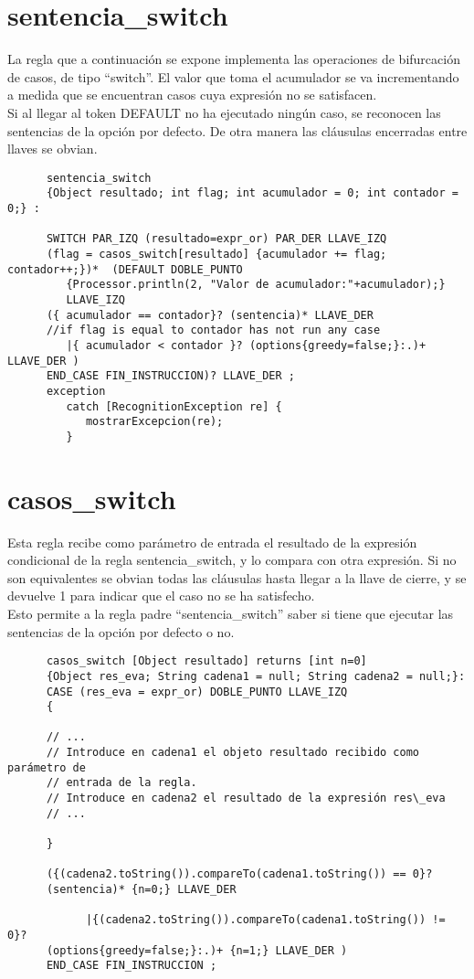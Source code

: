    \section{sentencia\_switch}
   La regla que a continuación se expone implementa las operaciones de bifurcación de casos, de tipo ``switch''. El valor que
   toma el acumulador se va incrementando a medida que se encuentran casos cuya expresión no se satisfacen.\\

   Si al llegar al token DEFAULT no ha ejecutado ningún caso, se reconocen las sentencias de la opción por defecto. De otra 
   manera las cláusulas encerradas entre llaves se obvian. 
   \begin{lstlisting}
      sentencia_switch 
      {Object resultado; int flag; int acumulador = 0; int contador = 0;} :
      
      SWITCH PAR_IZQ (resultado=expr_or) PAR_DER LLAVE_IZQ
      (flag = casos_switch[resultado] {acumulador += flag; contador++;})*  (DEFAULT DOBLE_PUNTO 
         {Processor.println(2, "Valor de acumulador:"+acumulador);} 
         LLAVE_IZQ
      ({ acumulador == contador}? (sentencia)* LLAVE_DER 
      //if flag is equal to contador has not run any case
         |{ acumulador < contador }? (options{greedy=false;}:.)+ LLAVE_DER )
      END_CASE FIN_INSTRUCCION)? LLAVE_DER ;
      exception
         catch [RecognitionException re] {
            mostrarExcepcion(re);
         }
   \end{lstlisting}

   \section{casos\_switch}
   Esta regla recibe como parámetro de entrada el resultado de la expresión condicional de la regla sentencia\_switch,
   y lo compara con otra expresión. Si no son equivalentes se obvian todas las cláusulas hasta llegar a la llave de cierre,
   y se devuelve 1 para indicar que el caso no se ha satisfecho.\\

   Esto permite a la regla padre ``sentencia\_switch'' saber si tiene que ejecutar las sentencias de la opción por defecto o no.
   \begin{lstlisting}
      casos_switch [Object resultado] returns [int n=0] 
      {Object res_eva; String cadena1 = null; String cadena2 = null;}: 
      CASE (res_eva = expr_or) DOBLE_PUNTO LLAVE_IZQ 
      {
      
      // ... 
      // Introduce en cadena1 el objeto resultado recibido como parámetro de 
      // entrada de la regla.
      // Introduce en cadena2 el resultado de la expresión res\_eva
      // ...  
      
      }
      
      ({(cadena2.toString()).compareTo(cadena1.toString()) == 0}? 
      (sentencia)* {n=0;} LLAVE_DER

            |{(cadena2.toString()).compareTo(cadena1.toString()) != 0}? 
      (options{greedy=false;}:.)+ {n=1;} LLAVE_DER )  
      END_CASE FIN_INSTRUCCION ;
   \end{lstlisting}

